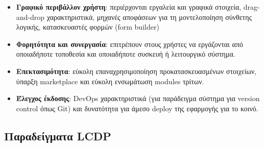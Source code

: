             \vspace{-0.5em}
            \begin{itemize}[label={\tiny \blacksquare}]
                \setlength\itemsep{-0.25em}
                \item \textbf{Γραφικό περιβάλλον χρήστη}: περιέρχονται εργαλεία και γραφικά στοιχεία, drag-and-drop χαρακτηριστικά, μηχανές αποφάσεων για τη μοντελοποίηση σύνθετης λογικής, κατασκευαστές φορμών (form builder)
                \item \textbf{Φορητότητα και συνεργασία}: επιτρέπουν στους χρήστες να εργάζονται από οποιαδήποτε τοποθεσία και οποιαδήποτε συσκευή ή λειτουργικό σύστημα.
                \item \textbf{Επεκτασιμότητα}: εύκολη επαναχρησιμοποίηση προκατασκευασμένων στοιχείων, ύπαρξη marketplace και εύκολη ενσωμάτωση modules τρίτων.
                \item \textbf{Έλεγχος έκδοσης}: DevOps χαρακτηριστικά (για παράδειγμα σύστημα για version control όπως Git) και δυνατότητα για άμεσο deploy της εφαρμογής για το κοινό.
            \end{itemize}
            \vspace{-0.5em}

        \subsection{Παραδείγματα LCDP}